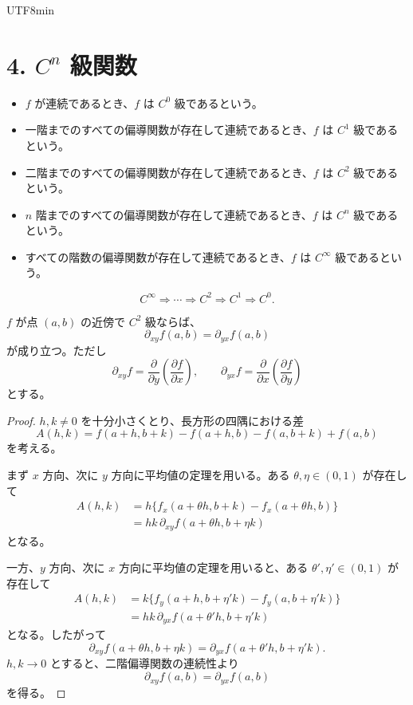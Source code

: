 \documentclass[a4paper,12pt]{article}
\begin{document}
\begin{CJK}{UTF8}{min}
\section*{4. $C^n$ 級関数}

\begin{itemize}
\item $f$ が連続であるとき、$f$ は $C^0$ 級であるという。
\item 一階までのすべての偏導関数が存在して連続であるとき、$f$ は $C^1$ 級であるという。
\item 二階までのすべての偏導関数が存在して連続であるとき、$f$ は $C^2$ 級であるという。
\item $n$ 階までのすべての偏導関数が存在して連続であるとき、$f$ は $C^n$ 級であるという。
\item すべての階数の偏導関数が存在して連続であるとき、$f$ は $C^\infty$ 級であるという。
\end{itemize}

\[
C^\infty\Longrightarrow\cdots\Longrightarrow
C^2\Longrightarrow C^1\Longrightarrow C^0.
\]

\begin{theorem}[混合偏微分の交換]
$f$ が点 $(a,b)$ の近傍で $C^2$ 級ならば、
\[
\partial_{xy}f(a,b)=\partial_{yx}f(a,b)
\]
が成り立つ。ただし
\[
\partial_{xy}f=\frac{\partial}{\partial y}
\left(\frac{\partial f}{\partial x}\right),
\qquad
\partial_{yx}f=\frac{\partial}{\partial x}
\left(\frac{\partial f}{\partial y}\right)
\]
とする。
\end{theorem}

\begin{proof}
$h,k\neq0$ を十分小さくとり、長方形の四隅における差
\[
A(h,k)
=f(a+h,b+k)-f(a+h,b)-f(a,b+k)+f(a,b)
\]
を考える。

まず $x$ 方向、次に $y$ 方向に平均値の定理を用いる。ある
$\theta,\eta\in(0,1)$ が存在して
\[
\begin{aligned}
A(h,k)
&=h\{f_x(a+\theta h,b+k)-f_x(a+\theta h,b)\}\\
&=hk\,\partial_{xy}f(a+\theta h,b+\eta k)
\end{aligned}
\]
となる。

一方、$y$ 方向、次に $x$ 方向に平均値の定理を用いると、ある
$\theta',\eta'\in(0,1)$ が存在して
\[
\begin{aligned}
A(h,k)
&=k\{f_y(a+h,b+\eta' k)-f_y(a,b+\eta' k)\}\\
&=hk\,\partial_{yx}f(a+\theta' h,b+\eta' k)
\end{aligned}
\]
となる。したがって
\[
\partial_{xy}f(a+\theta h,b+\eta k)
=\partial_{yx}f(a+\theta' h,b+\eta' k).
\]
$h,k\to0$ とすると、二階偏導関数の連続性より
\[
\partial_{xy}f(a,b)=\partial_{yx}f(a,b)
\]
を得る。
\end{proof}
\ifPDFTeX
\end{CJK}
\fi
\end{document}

